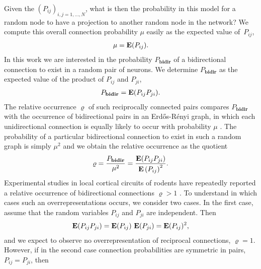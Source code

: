 %
Given the $(P_{ij})_{i,j=1,\dots,N}$, what is then the probability in
this model for a random node to have a projection to another random
node in the network?
%
We compute this overall connection probability $\mu$ easily as the
expected value of~$P_{ij}$,
\begin{align}
\mu = \operatorname{\mathbf{E}}(P_{ij}).
\end{align}
%
%
%
In this work we are interested in the probability $P_{\mathbf{bidir}}$
of a bidirectional connection to exist in a random pair of neurons.
%
We determine $P_{\mathbf{bidir}}$ as the expected value of the product
of $P_{ij}$ and $P_{ji}$,
%
\begin{align}
P_{\mathbf{bidir}} = \operatorname{\mathbf{E}}(P_{ij} P_{ji}).
\end{align}
%
The relative occurrence $\varrho$ of such reciprocally connected pairs compares $P_{\mathbf{bidir}}$ with the occurrence of bidirectional pairs in an Erd\H{o}s-R\'{e}nyi graph, in which each unidirectional connection is equally likely to occur with probability $\mu$ \cite{Gilbert1959, Erdos1959}. The probability of a particular bidirectional connection to exist in such a random graph is simply $\mu^2$ and we obtain the relative occurrence as the quotient
\begin{align}
\varrho = \frac{P_{\mathbf{bidir}}}{\mu^2} = \frac{\operatorname{\mathbf{E}}(P_{ij}P_{ji})}{{\operatorname{\mathbf{E}}\left(P_{ij}\right)}^2}.
\end{align}
%
Experimental studies in local cortical circuits of rodents have repeatedly reported a relative occurrence of bidirectional connections $\varrho > 1$ \cite{Markram1997, Song2005, Perin2011}. To understand in which cases such an overrepresentations occurs, we consider two cases. In the first case, assume that the random variables $P_{ij}$ and $P_{ji}$ are independent. Then
\begin{align}
\operatorname{\mathbf{E}}(P_{ij} P_{ji}) = \operatorname{\mathbf{E}}(P_{ij})\,\operatorname{\mathbf{E}}(P_{ji}) = \operatorname{\mathbf{E}}(P_{ij})^2,
\end{align}
and we expect to observe no overrepresentation of reciprocal connections, $\varrho = 1$. However, if in the second case connection probabilities are symmetric in pairs, $P_{ij} = P_{ji}$, then 
